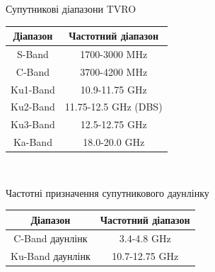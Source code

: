 
{

\centering

Супутникові діапазони TVRO\\
\begin{tabular}{|c|c|}\hline
Діапазон     & Частотний діапазон      \\ \hline
S-Band   & 1700-3000 MHz        \\
C-Band   & 3700-4200 MHz        \\
Ku1-Band & 10.9-11.75 GHz       \\
Ku2-Band & 11.75-12.5 GHz (DBS) \\
Ku3-Band & 12.5-12.75 GHz       \\
Ka-Band  & 18.0-20.0 GHz        \\
\hline
\end{tabular}\\

\vspace{0.1in}

Частотні призначення супутникового даунлінку\\
\begin{tabular}{|c|c|}\hline
Діапазон     & Частотний діапазон          \\ \hline
C-Band даунлінк   & 3.4-4.8 GHz     \\
Ku-Band даунлінк  & 10.7-12.75 GHz  \\
\hline
\end{tabular}\\

}
